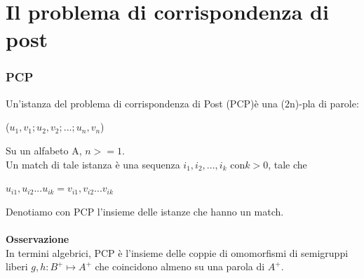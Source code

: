 \chapter{Il problema di corrispondenza di post} \label{ch:capitolo7}
\subsection{PCP}
Un’istanza del problema di corrispondenza di Post (PCP)è una ($2$n)-pla di parole:
\begin{center}
    ($u_1, v_1; u_2, v_2;...;u_n,v_n$)
\end{center}
Su un alfabeto A, $n >= 1$.\\
Un match di tale istanza è una sequenza $i_1, i_2,...,i_k$ con$ k > 0$, tale che
\begin{center}
    $u_{i1},u_{i2} ... u_{ik} = v_{i1},v_{i2} ... v_{ik}$
\end{center}
Denotiamo con PCP l’insieme delle istanze che hanno un match.\\\\
\textbf{Osservazione}\\
In termini algebrici, PCP è l’insieme delle coppie di omomorfismi di semigruppi liberi $g, h : B^+ \mapsto A^+$ che coincidono almeno su una parola di $A^+$.
\newpage
